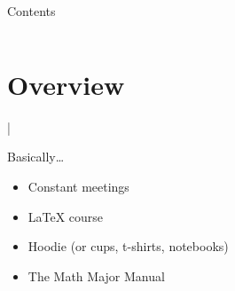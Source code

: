 \begin{frame}
    \maketitle
\end{frame}

\begin{frame}{Contents}
    \begin{columns}
        \linespread{1.75}\selectfont
         \tableofcontents
    \end{columns}
   
\end{frame}

\section{Overview}
|
\begin{frame}{Basically\ldots}
    \begin{itemize}
        \item Constant meetings
        \item LaTeX course
        \item Hoodie (or cups, t-shirts, notebooks)
        \item The Math Major Manual
    \end{itemize}
\end{frame}